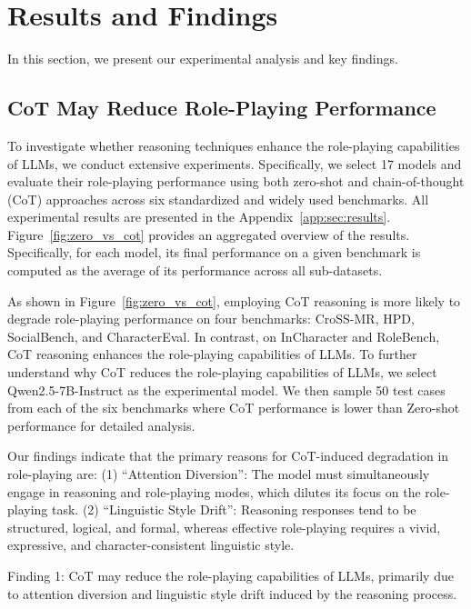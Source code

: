 


\section{Results and Findings}
In this section, we present our experimental analysis and key findings.


\subsection{CoT May Reduce Role-Playing Performance}

To investigate whether reasoning techniques enhance the role-playing capabilities of LLMs, we conduct extensive experiments. 
Specifically, we select 17 models and evaluate their role-playing performance using both zero-shot and chain-of-thought (CoT) approaches across six standardized and widely used benchmarks.
All experimental results are presented in the Appendix~\ref{app:sec:results}. 
Figure~\ref{fig:zero_vs_cot} provides an aggregated overview of the results. 
Specifically, for each model, its final performance on a given benchmark is computed as the average of its performance across all sub-datasets.

As shown in Figure~\ref{fig:zero_vs_cot}, employing CoT reasoning is more likely to degrade role-playing performance on four benchmarks: CroSS-MR, HPD, SocialBench, and CharacterEval. 
In contrast, on InCharacter and RoleBench, CoT reasoning enhances the role-playing capabilities of LLMs.
To further understand why CoT reduces the role-playing capabilities of LLMs, we select Qwen2.5-7B-Instruct as the experimental model. 
We then sample 50 test cases from each of the six benchmarks where CoT performance is lower than Zero-shot performance for detailed analysis.

Our findings indicate that the primary reasons for CoT-induced degradation in role-playing are:
(1) “Attention Diversion”: The model must simultaneously engage in reasoning and role-playing modes, which dilutes its focus on the role-playing task.
(2) “Linguistic Style Drift”: Reasoning responses tend to be structured, logical, and formal, whereas effective role-playing requires a vivid, expressive, and character-consistent linguistic style. 

\begin{AIbox}
{Finding 1:}
CoT may reduce the role-playing capabilities of LLMs, primarily due to attention diversion and linguistic style drift induced by the reasoning process.
\end{AIbox}


